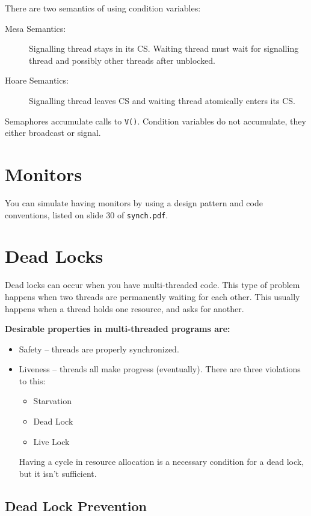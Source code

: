 \documentclass[12pt]{article}
\begin{document}
There are two semantics of using condition variables:
\begin{description}
    \item[Mesa Semantics:] Signalling thread stays in its CS. Waiting thread
        must wait for signalling thread and possibly other threads after
        unblocked.
    \item[Hoare Semantics:] Signalling thread leaves CS and waiting thread
        atomically enters its CS.
\end{description}

Semaphores accumulate calls to \texttt{V()}. Condition variables do not
accumulate, they either broadcast or signal.

\section{Monitors}

You can simulate having monitors by using a design pattern and code conventions,
listed on slide 30 of \texttt{synch.pdf}.

\section{Dead Locks}

Dead locks can occur when you have multi-threaded code. This type of problem
happens when two threads are permanently waiting for each other. This usually
happens when a thread holds one resource, and asks for another.

\textbf{Desirable properties in multi-threaded programs are:}
\begin{itemize}
    \item Safety -- threads are properly synchronized.
    \item Liveness -- threads all make progress (eventually). There are three
        violations to this:
        \begin{itemize}
            \item Starvation
            \item Dead Lock
            \item Live Lock
        \end{itemize}
        Having a cycle in resource allocation is a necessary condition for a
        dead lock, but it isn't sufficient.
\end{itemize}

\subsection{Dead Lock Prevention}
\end{document}

